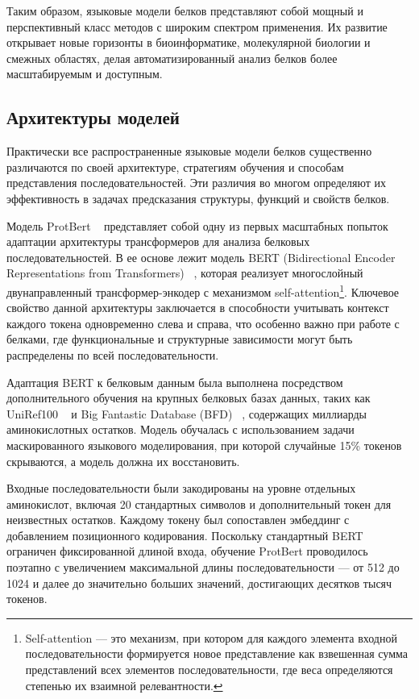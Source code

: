 \documentclass[specification,annotation,times]{itmo-student-thesis}
\begin{document}
Таким образом, языковые модели белков представляют собой мощный и перспективный класс методов с широким спектром применения. Их развитие открывает новые горизонты в биоинформатике, молекулярной биологии и смежных областях, делая автоматизированный анализ белков более масштабируемым и доступным.

\subsection{Архитектуры моделей}

Практически все распространенные языковые модели белков существенно различаются по своей архитектуре, стратегиям обучения и способам представления последовательностей. Эти различия во многом определяют их эффективность в задачах предсказания структуры, функций и свойств белков. 

Модель ProtBert ~\cite{elnaggar2021prottrans} представляет собой одну из первых масштабных попыток адаптации архитектуры трансформеров для анализа белковых последовательностей. В ее основе лежит модель BERT (Bidirectional Encoder Representations from Transformers) ~\cite{devlin2019bert}, которая реализует многослойный двунаправленный трансформер-энкодер с механизмом self-attention\footnote{Self-attention — это механизм, при котором для каждого элемента входной последовательности формируется новое представление как взвешенная сумма представлений всех элементов последовательности, где веса определяются степенью их взаимной релевантности.}. Ключевое свойство данной архитектуры заключается в способности учитывать контекст каждого токена одновременно слева и справа, что особенно важно при работе с белками, где функциональные и структурные зависимости могут быть распределены по всей последовательности.

Адаптация BERT к белковым данным была выполнена посредством дополнительного обучения на крупных белковых базах данных, таких как UniRef100 ~\cite{suzek2007uniref} и Big Fantastic Database (BFD) ~\cite{jumper2021highly}, содержащих миллиарды аминокислотных остатков. Модель обучалась с использованием задачи маскированного языкового моделирования, при которой случайные 15\% токенов скрываются, а модель должна их восстановить.

Входные последовательности были закодированы на уровне отдельных аминокислот, включая 20 стандартных символов и дополнительный токен для неизвестных остатков. Каждому токену был сопоставлен эмбеддинг с добавлением позиционного кодирования. Поскольку стандартный BERT ограничен фиксированной длиной входа, обучение ProtBert проводилось поэтапно с увеличением максимальной длины последовательности — от 512 до 1024 и далее до значительно больших значений, достигающих десятков тысяч токенов.
\end{document}
